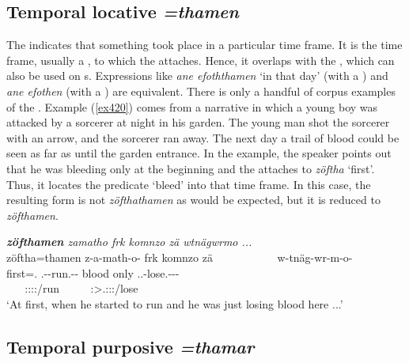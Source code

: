 \subsection{Temporal locative \emph{=thamen}} \label{temporallocativecase}  

The   indicates that something took place in a particular time frame. It is the time frame, usually a  , to which the   attaches. Hence, it overlaps with the  , which can also be used on  s. Expressions like \emph{ane efoththamen} `in that day' (with a  ) and \emph{ane efothen} (with a ) are equivalent. There is only a handful of corpus examples of the  . Example (\ref{ex420}) comes from a narrative in which a young boy was attacked by a sorcerer at night in his garden. The young man shot the sorcerer with an arrow, and the sorcerer ran away. The next day a trail of blood could be seen as far as until the garden entrance. In the example, the speaker points out that he was bleeding only at the beginning and the   attaches to \emph{zöftha} `first'. Thus, it locates the predicate `bleed' into that time frame. In this case, the resulting form is not \emph{zöfthathamen} as would be expected, but it is reduced to \emph{zöfthamen}.

\begin{exe}
	\ex \emph{\textbf{zöfthamen} zamatho frk komnzo zä wtnägwrmo ...}\\
	\glll zöftha=thamen z-a-math-o-\Zero{} frk komnzo zä~~~~~~~~~~~ w-tnäg-wr-m-o-\Zero\\
	first=\Temp.\Loc{} \M.\Gam-\Ndu-run.\Rs-\Andat-\Stsg{} blood only \Prox{} \Tsg.\F.\Alph-lose.\Ext-\Ndu-\Dur-\Andat{}\\
	~ ~ {\Stsg:\Sbj:\Rpst:\Pfv:\Andat/run} ~ ~ ~ {\Stsg:\Sbj>\Tsg.\F:\Rpst:\Dur:\Andat/lose}\\
	\trans `At first, when he started to run and he was just losing blood here ...'\\
	\label{ex420}
\end{exe}

\subsection{Temporal purposive \emph{=thamar}} \label{temporalpurposivecase}

